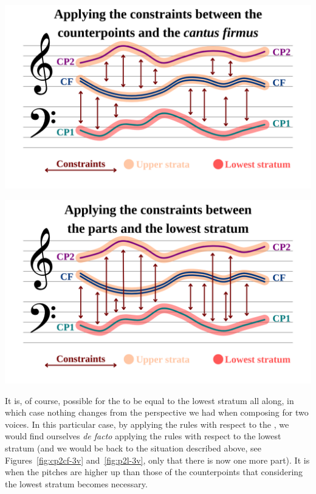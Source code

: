 \vspace{.5cm}
\begin{minipage}{0.46\textwidth}
    \centering
    \includegraphics[width=\textwidth]{Images/cp2cf-3v.png}
    \label{fig:cp2cf-3v}
    \end{minipage}
    \hfill
    \begin{minipage}{0.46\textwidth}
      \centering
      \includegraphics[width=\textwidth]{Images/p2l-3v.png}
      \label{fig:p2l-3v}
\end{minipage}
\vspace{.5cm}

It is, of course, possible for the \cfs to be equal to the lowest stratum all along, in which case nothing changes from the perspective we had when composing for two voices. In this particular case, by applying the rules with respect to the \cf, we would find ourselves \textit{de facto} applying the rules with respect to the lowest stratum (and we would be back to the situation described above, see Figures~\ref{fig:cp2cf-3v} and~\ref{fig:p2l-3v}, only that there is now one more part). It is when the \cfs pitches are higher up than those of the counterpoints that considering the lowest stratum becomes necessary.

